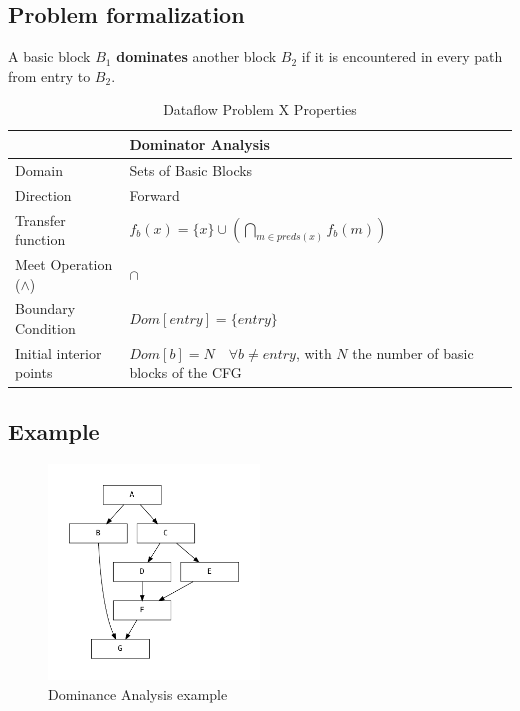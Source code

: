 \documentclass{article}
\begin{document}
\subsection{Problem formalization}

A basic block $B_1$ \textbf{dominates} another block $B_2$ if it is encountered in every path from entry to $B_2$.

\begin{table}[H]
	\centering
	\begin{tabular}{|p{}|p{}|}
		\hline
		                          & \textbf{Dominator Analysis}                                                             \\
		\hline
		Domain                    & Sets of Basic Blocks                                                                    \\
		\hline
		Direction                 & Forward                                                                                 \\
		\hline
		Transfer function         & $f_b(x) = \{x\} \cup (\bigcap_{m \in preds(x)} f_b(m)) $                                \\
		\hline
		Meet Operation ($\wedge$) & $\cap$                                                                                  \\
		\hline
		Boundary Condition        & $Dom[entry] = \{entry\}$                                                                \\
		\hline
		Initial interior points   & $Dom[b] = N \quad \forall b \neq entry$, with $N$ the number of basic blocks of the CFG \\
		\hline
	\end{tabular}
	\caption{Dataflow Problem X Properties}
	\label{tab:dataflow_problem_x}
\end{table}

\subsection{Example}

\begin{figure}[H]
	\centering
	\includegraphics[width=0.5\textwidth]{graphs/dominance.pdf}
	\caption{Dominance Analysis example}
	\label{fig:enter-label}
\end{figure}
\end{document}
